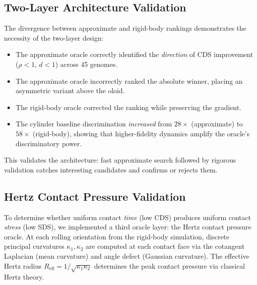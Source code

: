 \documentclass[11pt,a4paper]{article}
\begin{document}
\subsection{Two-Layer Architecture Validation}

The divergence between approximate and rigid-body rankings demonstrates
the necessity of the two-layer design:

\begin{itemize}[leftmargin=*]
  \item The approximate oracle correctly identified the \emph{direction}
    of CDS improvement ($\rho < 1$, $d < 1$) across 45 genomes.
  \item The approximate oracle incorrectly ranked the absolute winner,
    placing an asymmetric variant above the oloid.
  \item The rigid-body oracle corrected the ranking while preserving the
    gradient.
  \item The cylinder baseline discrimination \emph{increased} from
    $28\times$ (approximate) to $58\times$ (rigid-body), showing that
    higher-fidelity dynamics amplify the oracle's discriminatory power.
\end{itemize}

This validates the architecture: fast approximate search followed by
rigorous validation catches interesting candidates and confirms or
rejects them.

\subsection{Hertz Contact Pressure Validation}
\label{sec:hertz}

To determine whether uniform contact \emph{time} (low CDS) produces
uniform contact \emph{stress} (low SDS), we implemented a third oracle
layer: the Hertz contact pressure oracle. At each rolling orientation
from the rigid-body simulation, discrete principal curvatures
$\kappa_1, \kappa_2$ are computed at each contact face via the cotangent
Laplacian (mean curvature) and angle defect (Gaussian curvature). The
effective Hertz radius $R_{\mathrm{eff}} = 1/\sqrt{\kappa_1 \kappa_2}$
determines the peak contact pressure via classical Hertz theory.
\end{document}
